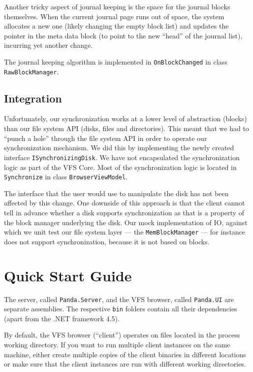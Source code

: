 \documentclass[a4paper,12pt]{article}
\begin{document}
Another tricky aspect of journal keeping is the space for the journal blocks themselves. 
When the current journal page runs out of space, the system allocates a new one (likely changing the empty block list) and updates the pointer in the meta data block (to point to the new ``head'' of the journal list), incurring yet another change.

The journal keeping algorithm is implemented in \lstinline!OnBlockChanged! in class \lstinline!RawBlockManager!.

\subsection{Integration}
Unfortunately, our synchronization works at a lower level of abstraction (blocks) than our file system API (disks, files and directories).
This meant that we had to ``punch a hole'' through the file system API in order to operate our synchronization mechanism.
We did this by implementing the newly created interface \lstinline!ISynchronizingDisk!. 
We have not encapsulated the synchronization logic as part of the VFS Core. 
Most of the synchronization logic is located in \lstinline!Synchronize! in class \lstinline!BrowserViewModel!.

The interface that the user would use to manipulate the disk has not been affected by this change.
One downside of this approach is that the client cannot tell in advance whether a disk supports synchronization as that is a property of the block manager underlying the disk.
Our mock implementation of IO, against which we unit test our file system layer --- the \lstinline!MemBlockManager! --- for instance does not support synchronization, because it is not based on blocks.


\section{Quick Start Guide}
The server, called \lstinline!Panda.Server!, and the VFS browser, called \lstinline!Panda.UI! are separate assemblies. The respective \lstinline!bin! folders contain all their dependencies (apart from the .NET framework 4.5).

By default, the VFS browser (``client'') operates on files located in the process working directory. If you want to run multiple client instances on the same machine, either create multiple copies of the client binaries in different locations or make sure that the client instances are run with different working directories.
\end{document}
